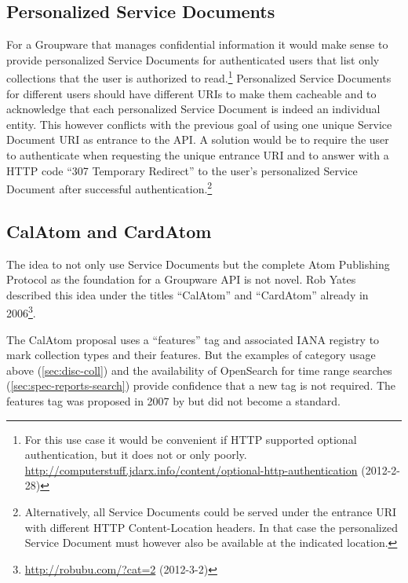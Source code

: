 \documentclass[11pt,a4paper,headsepline,twoside]{scrartcl}		%
\newcommand{\citeurl}[2]{\url{#1} (#2)}
\begin{document}
\subsection{Personalized Service Documents} For a Groupware that manages
confidential information it would make sense to provide personalized Service
Documents for authenticated users that list only collections that the user is
authorized to read.\footnote{For this use case it would be convenient if HTTP
  supported optional authentication, but it does not or only
  poorly. \citeurl{http://computerstuff.jdarx.info/content/optional-http-authentication}{2012-2-28}}
Personalized Service Documents for different users should have different URIs to
make them cacheable and to acknowledge that each personalized Service Document
is indeed an individual entity. This however conflicts with the previous goal of
using one unique Service Document URI as entrance to the API. A solution would
be to require the user to authenticate when requesting the unique entrance URI
and to answer with a HTTP code ``307 Temporary Redirect'' to the user's
personalized Service Document after successful
authentication.\footnote{Alternatively, all Service Documents could be served under
  the entrance URI with different HTTP Content-Location
  headers\cite[sec. 14.14]{RFC2616}. In that case the personalized Service
  Document must however also be available at the indicated location.}


\subsection{CalAtom and CardAtom}
\label{sec:atom-publ-prot}

The idea to not only use Service Documents but the complete Atom Publishing
Protocol as the foundation for a Groupware API is not novel. Rob Yates described
this idea under the titles ``CalAtom'' and ``CardAtom'' already in
2006\footnote{\citeurl{http://robubu.com/?cat=2}{2012-3-2}}.

The CalAtom \cite{draft-yates-atompub-calatom-00.txt} proposal uses a
``features'' tag and associated IANA registry to mark collection types and their
features. But the examples of category usage above (\autoref{sec:disc-coll}) and
the availability of OpenSearch for time range searches
(\autoref{sec:spec-reports-search}) provide confidence that a new tag is not
required. The features tag was proposed in 2007 by
 \cite{draft-snell-atompub-feature} but did not become a standard.
\end{document}

